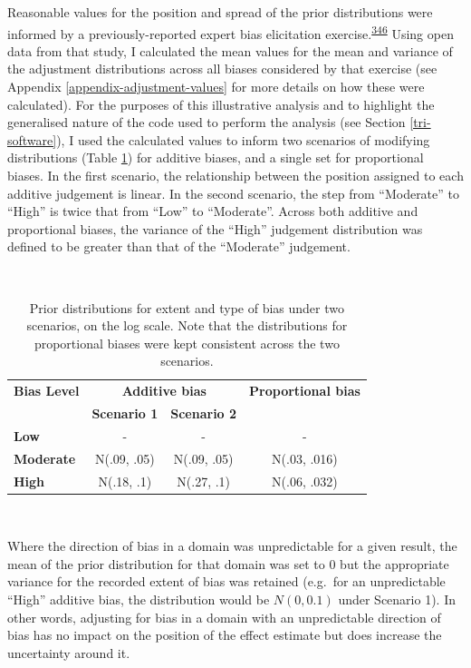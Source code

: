 \documentclass[a4paper, twoside]{templates/ociamthesis}
\begin{document}
Reasonable values for the position and spread of the prior distributions were informed by a previously-reported expert bias elicitation exercise.\textsuperscript{\protect\hyperlink{ref-turner2009}{346}} Using open data from that study, I calculated the mean values for the mean and variance of the adjustment distributions across all biases considered by that exercise (see Appendix \ref{appendix-adjustment-values} for more details on how these were calculated). For the purposes of this illustrative analysis and to highlight the generalised nature of the code used to perform the analysis (see Section \ref{tri-software}), I used the calculated values to inform two scenarios of modifying distributions (Table \ref{tab:priorsAdd-table}) for additive biases, and a single set for proportional biases. In the first scenario, the relationship between the position assigned to each additive judgement is linear. In the second scenario, the step from ``Moderate'' to ``High'' is twice that from ``Low'' to ``Moderate''. Across both additive and proportional biases, the variance of the ``High'' judgement distribution was defined to be greater than that of the ``Moderate'' judgement.

~





\begin{table}[H]

\caption[Prior distributions mapped to different extents of bias.]{\label{tab:priorsAdd-table}Prior distributions for extent and type of bias under two scenarios, on the log scale. Note that the distributions for proportional biases were kept consistent across the two scenarios.}
\centering
\begin{tabular}[t]{>{}lccc}
\toprule
\multicolumn{1}{c}{\textbf{Bias Level}} & \multicolumn{2}{c}{\textbf{Additive bias}} & \multicolumn{1}{c}{\textbf{Proportional bias}} \\
\textbf{} & \textbf{Scenario 1} & \textbf{Scenario 2} & \textbf{}\\
\midrule
\textbf{Low} & - & - & -\\
\midrule
\textbf{Moderate} & N(.09, .05) & N(.09, .05) & N(.03, .016)\\
\midrule
\textbf{High} & N(.18, .1) & N(.27, .1) & N(.06, .032)\\
\bottomrule
\end{tabular}
\end{table}

~

Where the direction of bias in a domain was unpredictable for a given result, the mean of the prior distribution for that domain was set to 0 but the appropriate variance for the recorded extent of bias was retained (e.g.~for an unpredictable ``High'' additive bias, the distribution would be \(N(0,0.1)\) under Scenario 1). In other words, adjusting for bias in a domain with an unpredictable direction of bias has no impact on the position of the effect estimate but does increase the uncertainty around it.
\end{document}
